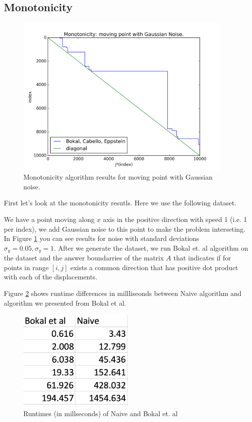 \documentclass{article}
\begin{document}
\subsection{Monotonicity}
\begin{figure}[!ht]
  \centering
  \includegraphics[height=8cm]{plots/monotonicity_moving_gaussian}
  \caption{Monotonicity algorithm results for moving point with Gaussian noise.}
  \label{fig:monotonicity_demo}
\end{figure}

First let's look at the monotonicity resutls. Here we use the following dataset.

We have a point moving along $x$ axis in the positive direction with speed 1 (i.e. 1 per index), we add Gaussian noise to this point to make the problem interseting. In Figure \ref{fig:monotonicity_demo} you can see results for noise with standard deviations $\sigma_y = 0.05, \sigma_y = 1$. After we generate the dataset, we run Bokal et. al algorithm on the dataset and the answer boundarries of the matrix $A$ that indicates if for points in range $[i, j]$ exists a common direction that has positive dot product with each of the displacements.

Figure \ref{fig:monotonicity_comparison} shows runtime differences in millliseonds between Naive algorithm and algorithm we presented from Bokal et al.
\begin{figure}[!ht]
  \centering
  \includegraphics[height=5cm]{plots/monotonicity_comparison}
  \caption{Runtimes (in millseconds) of Naive and Bokal et. al}
  \label{fig:monotonicity_comparison}
\end{figure}
\end{document}
